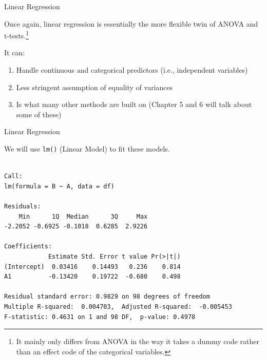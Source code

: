 \begin{frame}{Linear Regression}

\large
Once again, linear regression is essentially the more flexible twin of
ANOVA and
t-tests.\footnote{It mainly only differs from ANOVA in the way it takes a dummy code rather than an effect code of the categorical variables.}

It can:

\begin{enumerate}
\def\labelenumi{\arabic{enumi}.}
\tightlist
\item
  Handle continuous and categorical predictors (i.e., independent
  variables)
\item
  Less stringent assumption of equality of variances
\item
  Is what many other methods are built on (Chapter 5 and 6 will talk
  about some of these)
\end{enumerate}

\end{frame}

\begin{frame}[fragile]{Linear Regression}

We will use \texttt{lm()} (Linear Model) to fit these models.

\small

\begin{Shaded}
\begin{Highlighting}[]
\StringTok{ }\OperatorTok{~}\StringTok{ }
\end{Highlighting}
\end{Shaded}

\begin{verbatim}

Call:
lm(formula = B ~ A, data = df)

Residuals:
    Min      1Q  Median      3Q     Max 
-2.2052 -0.6925 -0.1018  0.6285  2.9226 

Coefficients:
            Estimate Std. Error t value Pr(>|t|)
(Intercept)  0.03416    0.14493   0.236    0.814
A1          -0.13420    0.19722  -0.680    0.498

Residual standard error: 0.9829 on 98 degrees of freedom
Multiple R-squared:  0.004703,  Adjusted R-squared:  -0.005453 
F-statistic: 0.4631 on 1 and 98 DF,  p-value: 0.4978
\end{verbatim}

\end{frame}

